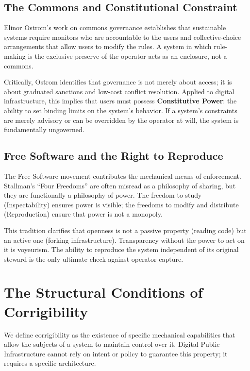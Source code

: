 \subsection{The Commons and Constitutional Constraint}

Elinor Ostrom's work on commons governance \citep{ostrom1990} establishes that sustainable systems require monitors who are accountable to the users and collective-choice arrangements that allow users to modify the rules. A system in which rule-making is the exclusive preserve of the operator acts as an enclosure, not a commons.

Critically, Ostrom identifies that governance is not merely about access; it is about graduated sanctions and low-cost conflict resolution. Applied to digital infrastructure, this implies that users must possess \textbf{Constitutive Power}: the ability to set binding limits on the system's behavior. If a system's constraints are merely advisory or can be overridden by the operator at will, the system is fundamentally ungoverned.

\subsection{Free Software and the Right to Reproduce}

The Free Software movement \citep{stallman2002} contributes the mechanical means of enforcement. Stallman's ``Four Freedoms'' are often misread as a philosophy of sharing, but they are functionally a philosophy of power. The freedom to study (Inspectability) ensures power is visible; the freedoms to modify and distribute (Reproduction) ensure that power is not a monopoly.

This tradition clarifies that openness is not a passive property (reading code) but an active one (forking infrastructure). Transparency without the power to act on it is voyeurism. The ability to reproduce the system independent of its original steward is the only ultimate check against operator capture.

\section{The Structural Conditions of Corrigibility}
\label{sec:tests}

We define corrigibility as the existence of specific mechanical capabilities that allow the subjects of a system to maintain control over it. Digital Public Infrastructure cannot rely on intent or policy to guarantee this property; it requires a specific architecture.

